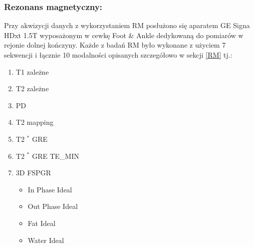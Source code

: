 \subsubsection{Rezonans magnetyczny:}
Przy akwizycji danych z wykorzystaniem RM posłużono się aparatem GE Signa HDxt 1.5T wyposażonym w cewkę Foot \& Ankle dedykowaną do pomiarów w rejonie dolnej kończyny. Każde z badań RM było wykonane z użyciem 7 sekwencji i łącznie 10 modalności opisanych szczegółowo w sekcji \ref{RM} tj.:
\begin{enumerate}
	\item T1 zależne
	\item T2 zależne
	\item PD
	\item T2 mapping
	\item T2 $^\ast$ GRE
	\item T2 $^\ast$ GRE TE\_MIN
	\item 3D FSPGR
	\begin{itemize}
		\item In Phase Ideal
		\item Out Phase Ideal
		\item Fat Ideal
		\item Water Ideal 
	\end{itemize}
\end{enumerate}


